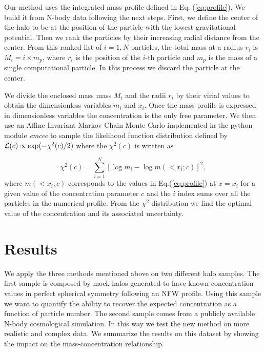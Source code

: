 \documentclass[a4,useAMS,usenatbib,usegraphicx]{mn2e}
\begin{document}
Our method uses the integrated mass profile defined in
Eq. (\ref{eq:profile}).
We build it from N-body data following the next steps.
First, we define the center of the halo to be at the position of the
particle with the lowest gravitational potential.  
Then we rank the particles by their increasing radial distance from
the center. 
From this ranked list of $i=1,N$ particles, the total mass at a radius
$r_i$ is $M_i=i\times m_p$, where $r_i$ is the position of the $i$-th
particle and $m_p$ is the mass of a single computational particle. 
In this process we discard the particle at the center. 

We divide the enclosed mass mass $M_i$ and the radii $r_i$ by their
virial values to obtain the dimensionless variables $m_i$ and $x_i$.
Once the mass profile is expressed in dimensionless variables the
concentration is the only free parameter. 
We then use an Affine Invariant Markov Chain Monte Carlo implemented in the
python module {\em emcee} \citep{emcee} to sample the likelihood
function distribution defined by ${\cal L}(c)\propto
\exp(-\chi^2(c)/2)$ where the $\chi^2(c)$ is 
written as

\begin{equation}
\chi^2(c)= \sum_{i=1}^{N}[\log m_i - \log m(< x_i;c)]^2,
\end{equation}
%
where $m(<x_i;c)$ corresponds to the values in Eq.(\ref{eq:profile})
at $x=x_i$ for a given value of the concentration parameter $c$ and
the $i$ index sums over all the particles in the numerical profile.
From the $\chi^2$ distribution we find the optimal value of the
concentration and its associated uncertainty.


\section{Results}
\label{sec:results}

We apply the three methods mentioned above on two different halo
samples.
The first sample is composed by mock halos generated to have known
concentration values in perfect spherical symmetry following an NFW
profile.    
Using this sample we want to quantify the ability to recover the
expected concentration as a function of particle number.
The second sample comes from a publicly available N-body cosmological
simulation.  
In this way we test the new method on more realistic and complex
data. 
We summarize the results on this dataset by showing the impact on the
mass-concentration relationship.
\end{document}
